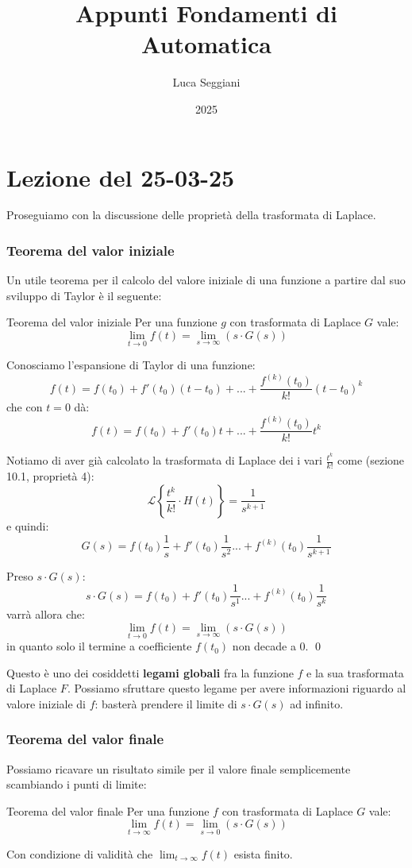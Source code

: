 \documentclass[a4paper,11pt]{article}
\title{Appunti Fondamenti di Automatica}
\author{Luca Seggiani}
\date{2025}
\begin{document}
\section{Lezione del 25-03-25}

\thispagestyle{empty}
\pagestyle{fancy}

Proseguiamo con la discussione delle proprietà della trasformata di Laplace.

\subsubsection{Teorema del valor iniziale}
Un utile teorema per il calcolo del valore iniziale di una funzione a partire dal suo sviluppo di Taylor è il seguente:
\begin{theorem}{Teorema del valor iniziale}
	Per una funzione $g$ con trasformata di Laplace $G$ vale:
	$$
	\lim_{t \rightarrow 0} f(t) = \lim_{s \rightarrow \infty} (s \cdot G(s))
	$$
\end{theorem}

Conosciamo l'espansione di Taylor di una funzione:
$$
f(t) = f(t_0) + f'(t_0) (t - t_0) + ... + \frac{f^{(k)}(t_0)}{k!}(t - t_0)^k
$$
che con $t = 0$ dà:
$$
f(t) = f(t_0) + f' (t_0) t + ... + \frac{f^{(k)}(t_0)}{k!}t^k
$$

Notiamo di aver già calcolato la trasformata di Laplace dei i vari $\frac{t^k}{k!}$ come (sezione 10.1, proprietà 4):
$$
\mathcal{L} \left\{ \frac{t^k}{k!} \cdot H(t) \right\} = \frac{1}{s^{k + 1}}
$$
e quindi:
$$
G(s) = f(t_0) \frac{1}{s} + f'(t_0) \frac{1}{s^2} ... + f^{(k)}(t_0) \frac{1}{s^{k + 1}}
$$

Preso $s \cdot G(s)$:
$$
s \cdot G(s) = f(t_0) + f'(t_0) \frac{1}{s^1} ... + f^{(k)}(t_0) \frac{1}{s^k}
$$
varrà allora che:
$$
\lim_{t \rightarrow 0} f(t) = \lim_{s \rightarrow \infty} (s \cdot G(s))
$$
in quanto solo il termine a coefficiente $f(t_0)$ non decade a 0. \qed

Questo è uno dei cosiddetti \textbf{legami globali} fra la funzione $f$ e la sua trasformata di Laplace $F$. 
Possiamo sfruttare questo legame per avere informazioni riguardo al valore iniziale di $f$: basterà prendere il limite di $s \cdot G(s)$ ad infinito.

\subsubsection{Teorema del valor finale}
Possiamo ricavare un risultato simile per il valore finale semplicemente scambiando i punti di limite:
\begin{theorem}{Teorema del valor finale}
	Per una funzione $f$ con trasformata di Laplace $G$ vale:
	$$
	\lim_{t \rightarrow \infty} f(t) = \lim_{s \rightarrow 0} (s \cdot G(s))
	$$
\end{theorem}
Con condizione di validità che $\lim_{t \rightarrow \infty} f(t)$ esista finito. 
\end{document}

